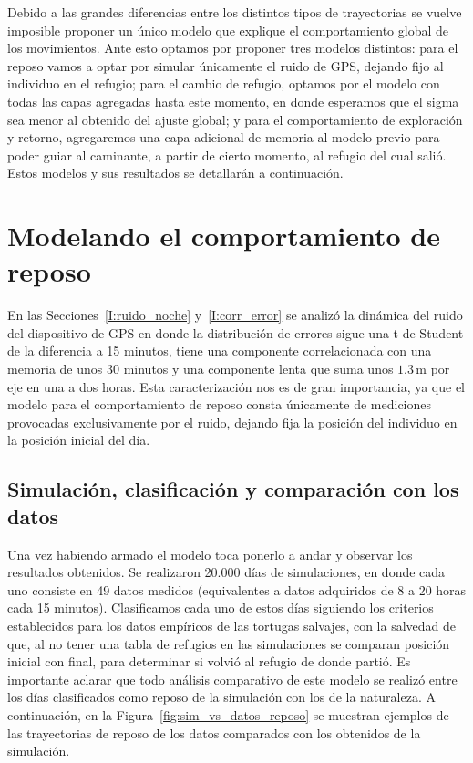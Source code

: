 Debido a las grandes diferencias entre los distintos tipos de trayectorias se vuelve imposible proponer un único modelo que explique el comportamiento global de los
movimientos. Ante esto optamos por proponer tres modelos distintos: para el reposo vamos a optar por simular únicamente el ruido de GPS, dejando fijo al individuo en el 
refugio; para el cambio de refugio, optamos por el modelo con todas las capas agregadas hasta este momento, en donde esperamos que el sigma sea menor al obtenido del ajuste
global; y para el comportamiento de exploración y retorno, agregaremos una capa adicional de memoria al modelo previo para poder guiar al caminante, a partir de cierto
momento, al refugio del cual salió. Estos modelos y sus resultados se detallarán a continuación.

\section{Modelando el comportamiento de reposo}\label{II:Reposo_Modelo}

En las Secciones~\ref{I:ruido_noche} y~\ref{I:corr_error} se analizó la dinámica del ruido del dispositivo de GPS en donde la distribución de errores sigue 
una t de Student de la diferencia a 15 minutos, tiene una componente correlacionada con una memoria de unos 30 minutos y una componente lenta que suma unos 
$1.3\,\mathrm{m}$ por eje en una a dos horas. Esta caracterización nos es de gran importancia, ya que el modelo para el comportamiento de reposo consta 
únicamente de mediciones provocadas exclusivamente por el ruido, dejando fija la posición del individuo en la posición inicial del día.

\subsection{Simulación, clasificación y comparación con los datos}

Una vez habiendo armado el modelo toca ponerlo a andar y observar los resultados obtenidos. Se realizaron 20.000 días de simulaciones, en donde cada uno consiste en 
49 datos medidos (equivalentes a datos adquiridos de 8 a 20 horas cada 15 minutos). Clasificamos cada uno de estos días siguiendo los criterios establecidos para los datos
empíricos de las tortugas salvajes, con la salvedad de que, al no tener una tabla de refugios en las simulaciones se comparan posición inicial con final, para determinar si 
volvió al refugio de donde partió. Es importante aclarar que todo análisis comparativo de este modelo se realizó entre los días clasificados como reposo de la simulación 
con los de la naturaleza. A continuación, en la Figura~\ref{fig:sim_vs_datos_reposo} se muestran ejemplos de las trayectorias de reposo de los datos comparados con los 
obtenidos de la simulación.

